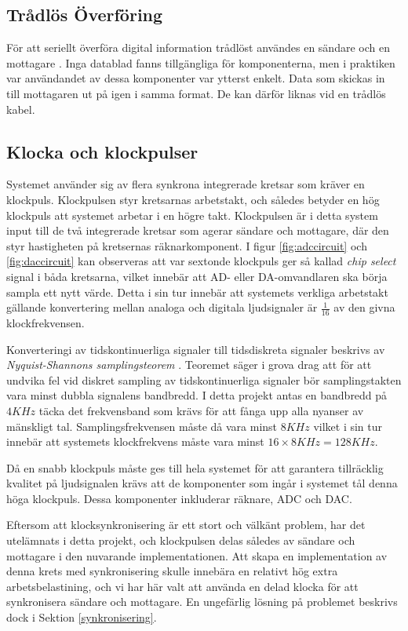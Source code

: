 \documentclass[a4paper,10pt]{article}
\begin{document}
\subsection{Trådlös Överföring}
För att seriellt överföra digital information trådlöst användes en sändare och 
en mottagare . Inga datablad fanns 
tillgängliga för komponenterna, men i praktiken var användandet av dessa 
komponenter var ytterst enkelt. Data som skickas in till mottagaren ut på igen i 
samma format. De kan därför liknas vid en trådlös kabel.

\subsection{Klocka och klockpulser}

Systemet använder sig av flera synkrona integrerade kretsar som kräver en
klockpuls. Klockpulsen styr kretsarnas arbetstakt, och således betyder en hög 
klockpuls att systemet arbetar i en högre takt. Klockpulsen är i detta system 
input till de två integrerade kretsar som agerar sändare och mottagare, där den 
styr hastigheten på kretsernas räknarkomponent. I figur \ref{fig:adccircuit} och 
\ref{fig:daccircuit} kan observeras att var sextonde klockpuls ger så kallad 
\textit{chip select} signal i båda kretsarna, vilket innebär att AD- eller 
DA-omvandlaren ska börja sampla ett nytt värde. Detta i sin tur innebär att 
systemets verkliga arbetstakt gällande konvertering mellan analoga och digitala 
ljudsignaler är $\frac{1}{16}$ av den givna klockfrekvensen.

Konverteringi av tidskontinuerliga signaler till tidsdiskreta signaler beskrivs 
av \textit{Nyquist-Shannons samplingsteorem} \cite{sampling}. Teoremet säger i 
grova drag att för att undvika fel vid diskret sampling av tidskontinuerliga 
signaler bör samplingstakten vara minst dubbla signalens bandbredd. I detta 
projekt antas en bandbredd på $4KHz$ täcka det frekvensband som krävs för att 
fånga upp alla nyanser av mänskligt tal. Samplingsfrekvensen måste då vara 
minst $8KHz$ vilket i sin tur innebär att systemets klockfrekvens måste vara 
minst $16 \times 8KHz = 128KHz$.

Då en snabb klockpuls måste ges till hela systemet för att garantera tillräcklig 
kvalitet på ljudsignalen krävs att de komponenter som ingår i systemet tål denna 
höga klockpuls. Dessa komponenter inkluderar räknare, ADC och DAC.

Eftersom att klocksynkronisering är ett stort och välkänt problem, har det 
utelämnats i detta projekt, och klockpulsen delas således av sändare och 
mottagare i den nuvarande implementationen. Att skapa en implementation av denna 
krets med synkronisering skulle innebära en relativt hög extra 
arbetsbelastining, och vi har här valt att använda en delad klocka för att 
synkronisera sändare och mottagare. En ungefärlig lösning på problemet beskrivs 
dock i Sektion \ref{synkronisering}.
\end{document}

